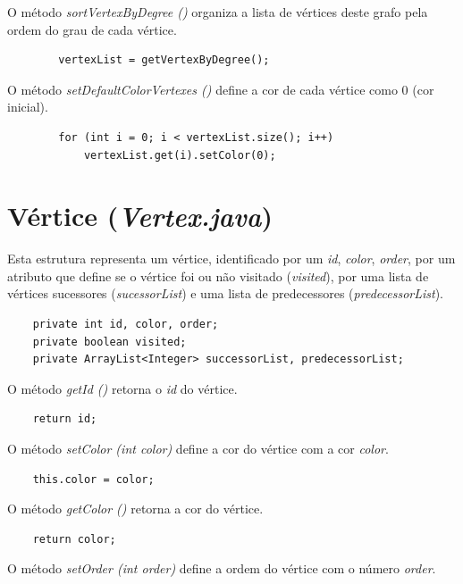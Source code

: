 \documentclass[a4paper,12pt]{report}
\begin{document}
O método \textit{sortVertexByDegree ()} organiza a lista de vértices deste grafo pela ordem do grau de cada vértice.

\begin{lstlisting}
        vertexList = getVertexByDegree();
\end{lstlisting}

O método \textit{setDefaultColorVertexes ()} define a cor de cada vértice como 0 (cor inicial).

\begin{lstlisting}
        for (int i = 0; i < vertexList.size(); i++)
            vertexList.get(i).setColor(0);
\end{lstlisting}

\section{Vértice (\textit{Vertex.java})}\label{vertex}

Esta estrutura representa um vértice, identificado por um \textit{id}, \textit{color}, \textit{order}, por um atributo que define se o vértice foi ou não visitado (\textit{visited}), por uma lista de vértices sucessores (\textit{sucessorList}) e uma lista de predecessores (\textit{predecessorList}).

\begin{lstlisting}
    private int id, color, order;
    private boolean visited;
    private ArrayList<Integer> successorList, predecessorList;
\end{lstlisting}

O método \textit{getId ()} retorna o \textit{id} do vértice.

\begin{lstlisting}
    return id;
\end{lstlisting}

O método \textit{setColor (int color)} define a cor do vértice com a cor \textit{color}.

\begin{lstlisting}
    this.color = color;
\end{lstlisting}

O método \textit{getColor ()} retorna a cor do vértice.

\begin{lstlisting}
    return color;
\end{lstlisting}

O método \textit{setOrder (int order)} define a ordem do vértice com o número \textit{order}.
\end{document}
